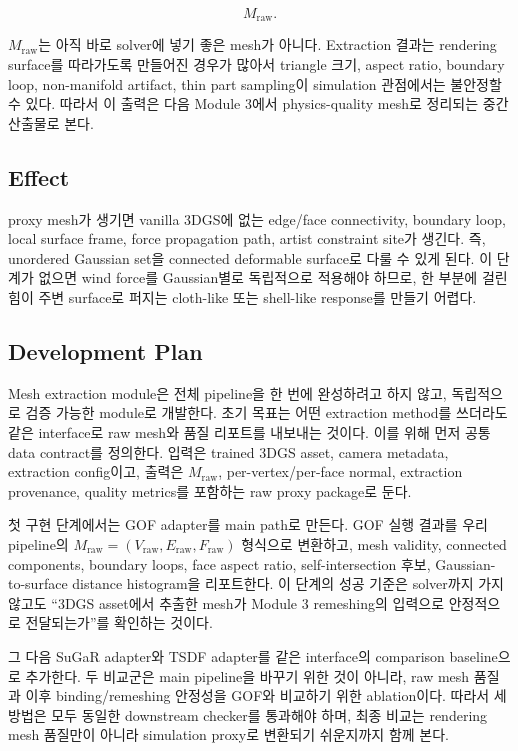 \documentclass[11pt,a4paper]{article}
\begin{document}
\begin{equation}
M_{\mathrm{raw}}.
\end{equation}

$M_{\mathrm{raw}}$는 아직 바로 solver에 넣기 좋은 mesh가 아니다.
Extraction 결과는 rendering surface를 따라가도록 만들어진 경우가 많아서 triangle 크기, aspect ratio, boundary loop, non-manifold artifact, thin part sampling이 simulation 관점에서는 불안정할 수 있다.
따라서 이 출력은 다음 Module 3에서 physics-quality mesh로 정리되는 중간 산출물로 본다.

\subsection*{Effect}

proxy mesh가 생기면 vanilla 3DGS에 없는 edge/face connectivity, boundary loop, local surface frame, force propagation path, artist constraint site가 생긴다. 즉, unordered Gaussian set을 connected deformable surface로 다룰 수 있게 된다.
이 단계가 없으면 wind force를 Gaussian별로 독립적으로 적용해야 하므로, 한 부분에 걸린 힘이 주변 surface로 퍼지는 cloth-like 또는 shell-like response를 만들기 어렵다.

\subsection*{Development Plan}

Mesh extraction module은 전체 pipeline을 한 번에 완성하려고 하지 않고, 독립적으로 검증 가능한 module로 개발한다.
초기 목표는 어떤 extraction method를 쓰더라도 같은 interface로 raw mesh와 품질 리포트를 내보내는 것이다.
이를 위해 먼저 공통 data contract를 정의한다.
입력은 trained 3DGS asset, camera metadata, extraction config이고, 출력은 $M_{\mathrm{raw}}$, per-vertex/per-face normal, extraction provenance, quality metrics를 포함하는 raw proxy package로 둔다.

첫 구현 단계에서는 GOF adapter를 main path로 만든다.
GOF 실행 결과를 우리 pipeline의 $M_{\mathrm{raw}}=(V_{\mathrm{raw}},E_{\mathrm{raw}},F_{\mathrm{raw}})$ 형식으로 변환하고, mesh validity, connected components, boundary loops, face aspect ratio, self-intersection 후보, Gaussian-to-surface distance histogram을 리포트한다.
이 단계의 성공 기준은 solver까지 가지 않고도 ``3DGS asset에서 추출한 mesh가 Module 3 remeshing의 입력으로 안정적으로 전달되는가''를 확인하는 것이다.

그 다음 SuGaR adapter와 TSDF adapter를 같은 interface의 comparison baseline으로 추가한다.
두 비교군은 main pipeline을 바꾸기 위한 것이 아니라, raw mesh 품질과 이후 binding/remeshing 안정성을 GOF와 비교하기 위한 ablation이다.
따라서 세 방법은 모두 동일한 downstream checker를 통과해야 하며, 최종 비교는 rendering mesh 품질만이 아니라 simulation proxy로 변환되기 쉬운지까지 함께 본다.
\end{document}

